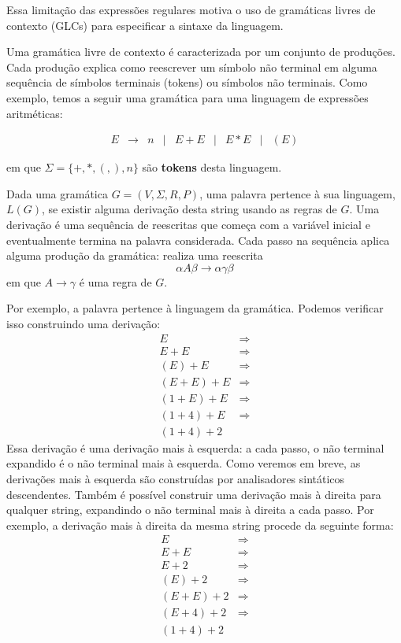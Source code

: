 Essa limitação das expressões regulares motiva o uso de gramáticas
livres de contexto (GLCs) para especificar a sintaxe da linguagem.

Uma gramática livre de contexto é caracterizada por um conjunto de
produções. Cada produção explica como reescrever um símbolo não
terminal em alguma sequência de símbolos terminais (tokens) ou
símbolos não terminais. Como exemplo, temos a seguir uma gramática
para uma linguagem de expressões aritméticas:

\[
  \begin{array}{lclclclcl}
    E & \to & n & | & E + E & | & E * E & | & (E)
  \end{array}
\]

em que \(\Sigma=\{+,*,(,),n\}\) são \textbf{tokens} desta linguagem.

Dada uma gramática \(G = (V,\Sigma, R, P)\), uma palavra pertence à
sua linguagem, \(L(G)\), se existir alguma derivação desta string
usando as regras de \(G\). Uma derivação é uma sequência de
reescritas que começa com a variável inicial e eventualmente termina
na palavra considerada. Cada passo na sequência aplica alguma
produção da gramática: realiza uma reescrita \[
  \alpha A \beta \to \alpha \gamma \beta
\] em que \(A \to \gamma\) é uma regra de \(G\).

Por exemplo, a palavra  pertence à
linguagem da gramática. Podemos verificar isso construindo uma derivação: \[
  \begin{array}{lc}
    E     & \Rightarrow \\
    E + E & \Rightarrow\\
    (E) + E & \Rightarrow\\
    (E + E) + E & \Rightarrow \\
    (1 + E) + E & \Rightarrow \\
    (1 + 4) + E & \Rightarrow\\
    (1 + 4) + 2
  \end{array}
\] Essa derivação é uma derivação mais à esquerda: a cada passo, o
não terminal expandido é o não terminal mais à esquerda. Como veremos
em breve, as derivações mais à esquerda são construídas por
analisadores sintáticos descendentes. Também é possível construir uma
derivação mais à direita para qualquer string, expandindo o não
terminal mais à direita a cada passo. Por exemplo, a derivação mais à
direita da mesma string procede da seguinte forma: \[
  \begin{array}{lc}
    E     & \Rightarrow \\
    E + E & \Rightarrow\\
    E + 2 & \Rightarrow\\
    (E) + 2 & \Rightarrow \\
    (E + E) + 2 & \Rightarrow \\
    (E + 4) + 2 & \Rightarrow\\
    (1 + 4) + 2
  \end{array}
\]

